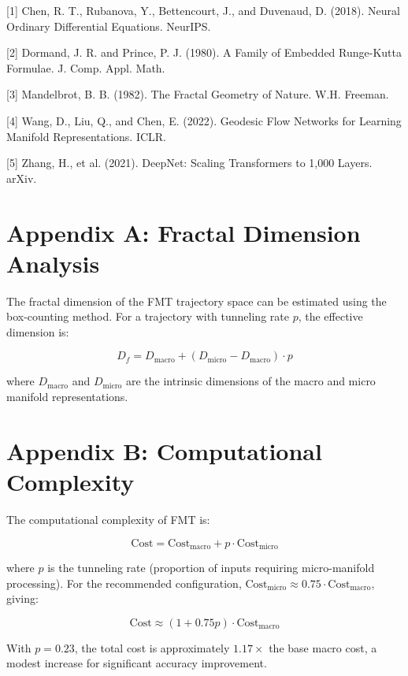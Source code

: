 \documentclass[12pt]{article}
\begin{document}
[1] Chen, R. T., Rubanova, Y., Bettencourt, J., and Duvenaud, D. (2018). Neural Ordinary Differential Equations. NeurIPS.

[2] Dormand, J. R. and Prince, P. J. (1980). A Family of Embedded Runge-Kutta Formulae. J. Comp. Appl. Math.

[3] Mandelbrot, B. B. (1982). The Fractal Geometry of Nature. W.H. Freeman.

[4] Wang, D., Liu, Q., and Chen, E. (2022). Geodesic Flow Networks for Learning Manifold Representations. ICLR.

[5] Zhang, H., et al. (2021). DeepNet: Scaling Transformers to 1,000 Layers. arXiv.

\appendix

\section*{Appendix A: Fractal Dimension Analysis}

The fractal dimension of the FMT trajectory space can be estimated using the box-counting method. For a trajectory with tunneling rate $p$, the effective dimension is:

\begin{equation}
D_f = D_{\text{macro}} + (D_{\text{micro}} - D_{\text{macro}}) \cdot p
\end{equation}

where $D_{\text{macro}}$ and $D_{\text{micro}}$ are the intrinsic dimensions of the macro and micro manifold representations.

\section*{Appendix B: Computational Complexity}

The computational complexity of FMT is:

\begin{equation}
\text{Cost} = \text{Cost}_{\text{macro}} + p \cdot \text{Cost}_{\text{micro}}
\end{equation}

where $p$ is the tunneling rate (proportion of inputs requiring micro-manifold processing). For the recommended configuration, $\text{Cost}_{\text{micro}} \approx 0.75 \cdot \text{Cost}_{\text{macro}}$, giving:

\begin{equation}
\text{Cost} \approx (1 + 0.75p) \cdot \text{Cost}_{\text{macro}}
\end{equation}

With $p=0.23$, the total cost is approximately $1.17 \times$ the base macro cost, a modest increase for significant accuracy improvement.
\end{document}
